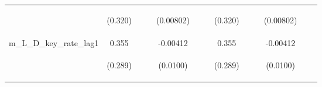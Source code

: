 \documentclass[]{article}
\begin{document}
\begin{center}
\begin{tabular}{lcccccccccccc}
\vspace{4pt} & \begin{footnotesize}(0.320)\end{footnotesize} & \begin{footnotesize}\end{footnotesize} & \begin{footnotesize}\end{footnotesize} & \begin{footnotesize}(0.00802)\end{footnotesize} & \begin{footnotesize}\end{footnotesize} & \begin{footnotesize}\end{footnotesize} & \begin{footnotesize}(0.320)\end{footnotesize} & \begin{footnotesize}\end{footnotesize} & \begin{footnotesize}\end{footnotesize} & \begin{footnotesize}(0.00802)\end{footnotesize} & \begin{footnotesize}\end{footnotesize} & \begin{footnotesize}\end{footnotesize} \\
m\_L\_D\_key\_rate\_lag1 & 0.355 &  &  & -0.00412 &  &  & 0.355 &  &  & -0.00412 &  &  \\
\vspace{4pt} & \begin{footnotesize}(0.289)\end{footnotesize} & \begin{footnotesize}\end{footnotesize} & \begin{footnotesize}\end{footnotesize} & \begin{footnotesize}(0.0100)\end{footnotesize} & \begin{footnotesize}\end{footnotesize} & \begin{footnotesize}\end{footnotesize} & \begin{footnotesize}(0.289)\end{footnotesize} & \begin{footnotesize}\end{footnotesize} & \begin{footnotesize}\end{footnotesize} & \begin{footnotesize}(0.0100)\end{footnotesize} & \begin{footnotesize}\end{footnotesize} & \begin{footnotesize}\end{footnotesize} \\

\end{tabular}
\end{center}
\end{document}
